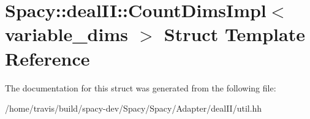 \hypertarget{structSpacy_1_1dealII_1_1CountDimsImpl}{\section{Spacy\-:\-:deal\-I\-I\-:\-:Count\-Dims\-Impl$<$ variable\-\_\-dims $>$ Struct Template Reference}
\label{structSpacy_1_1dealII_1_1CountDimsImpl}
}


The documentation for this struct was generated from the following file\-:\begin{DoxyCompactItemize}
\item 
/home/travis/build/spacy-\/dev/\-Spacy/\-Spacy/\-Adapter/deal\-I\-I/util.\-hh\end{DoxyCompactItemize}
